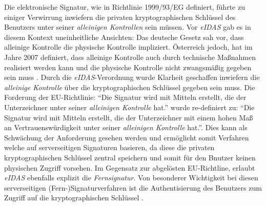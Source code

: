 \documentclass[11pt,a4paper,ngerman]{scrreprt}
\begin{document}
Die elektronische Signatur, wie in Richtlinie 1999/93/EG definiert, führte zu einiger Verwirrung inwiefern die privaten kryptographischen Schlüssel des Benutzers unter seiner \emph{alleinigen Kontrollen} sein müssen. Vor \emph{eIDAS} gab es in diesem Kontext uneinheitliche Ansichten: Das deutsche Gesetz sah vor, dass alleinige Kontrolle die physische Kontrolle impliziert. Österreich jedoch, hat im Jahre 2007 definiert, dass alleinige Kontrolle auch durch technische Maßnahmen realisiert werden kann und die physische Kontrolle nicht zwangsmäßig gegeben sein muss \cite[S.\,220]{scWorkshop}. Durch die \textit{eIDAS}-Verordnung wurde Klarheit geschaffen inwiefern die \emph{alleinige Kontrolle} über die kryptographischen Schlüssel gegeben sein muss. Die Forderung der EU-Richtlinie: ``Die Signatur wird mit Mitteln erstellt, die der Unterzeichner unter seiner \emph{alleinigen Kontrolle} hat.'' wurde re-definiert zu: ``Die Signatur wird mit Mitteln erstellt, die der Unterzeichner mit einem hohen Maß an Vertrauenswürdigkeit unter seiner \emph{alleinigen Kontrolle} hat.''\cite[S.\,221]{scWorkshop}. Dies kann als Schwächung der Anforderung gesehen werden und ermöglicht somit Verfahren welche auf serverseitigen Signaturen basieren, da diese die privaten kryptographischen Schlüssel zentral speichern und somit für den Bnutzer keinen physischen Zugriff vorsehen. Im Gegensatz zur abgelösten EU-Richtline, erlaubt \textit{eIDAS} ebenfalls explizit die \emph{Fernsignatur}. Von besonderer Wichtigkeit bei diesen serverseitigen (Fern-)Signaturverfahren ist die Authentisierung des Benutzers zum Zugriff auf die kryptographischen Schlüssel \cite[223]{scWorkshop}. 
\end{document}
